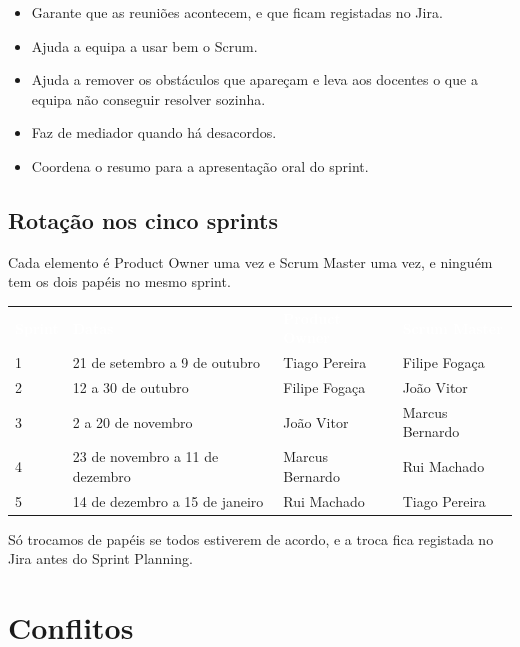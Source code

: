 \documentclass[11pt,a4paper]{article}
\newcommand{\th}[1]{\textcolor{white}{\sffamily\bfseries #1}}
\begin{document}
\begin{tcolorbox}[caixa, title={Scrum Master}]
  \begin{itemize}
    \item Garante que as reuniões acontecem, e que ficam registadas no Jira.
    \item Ajuda a equipa a usar bem o Scrum.
    \item Ajuda a remover os obstáculos que apareçam e leva aos docentes o que a equipa não conseguir resolver sozinha.
    \item Faz de mediador quando há desacordos.
    \item Coordena o resumo para a apresentação oral do sprint.
  \end{itemize}
\end{tcolorbox}

\subsection{Rotação nos cinco sprints}

Cada elemento é Product Owner uma vez e Scrum Master uma vez, e ninguém tem os dois papéis no mesmo sprint.

\renewcommand{\arraystretch}{1.5}
\begin{tabularx}{\textwidth}{N{1.6cm} L{5.2cm} Y Y}
   \th{Sprint} & \th{Datas} & \th{Product Owner} & \th{Scrum Master} \\
   1 & 21 de setembro a 9 de outubro  & Tiago Pereira   & Filipe Fogaça \\
          2 & 12 a 30 de outubro             & Filipe Fogaça   & João Vitor \\
   3 & 2 a 20 de novembro             & João Vitor      & Marcus Bernardo \\
          4 & 23 de novembro a 11 de dezembro & Marcus Bernardo & Rui Machado \\
   5 & 14 de dezembro a 15 de janeiro & Rui Machado     & Tiago Pereira \\
  \bottomrule
\end{tabularx}
\renewcommand{\arraystretch}{1}

Só trocamos de papéis se todos estiverem de acordo, e a troca fica registada no Jira antes do Sprint Planning.

\section{Conflitos}
\end{document}
